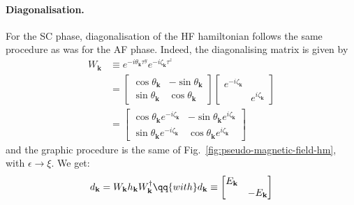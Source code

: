 \paragraph{Diagonalisation.}

For the SC phase, diagonalisation of the HF hamiltonian follows the same procedure as was for the AF phase. Indeed, the diagonalising matrix is given by
\begin{align}
	W_\mathbf{k} &\equiv e^{-i \theta_\mathbf{k} \tau^y} e^{-i \zeta_\mathbf{k} \tau^z} \nonumber \\
	&= \begin{bmatrix}
		\cos \theta_\mathbf{k} & - \sin \theta_\mathbf{k} \\
		\sin \theta_\mathbf{k} & \cos \theta_\mathbf{k}
	\end{bmatrix} \begin{bmatrix}
		e^{-i\zeta_\mathbf{k}} & \\ 
		& e^{i\zeta_\mathbf{k}}
	\end{bmatrix} \nonumber \\
	&= \begin{bmatrix}
		\cos \theta_\mathbf{k} e^{-i\zeta_\mathbf{k}} & - \sin \theta_\mathbf{k} e^{i\zeta_\mathbf{k}} \\
		\sin \theta_\mathbf{k} e^{-i\zeta_\mathbf{k}} & \cos \theta_\mathbf{k} e^{i\zeta_\mathbf{k}}
	\end{bmatrix} \label{eq:sc-hm-diagonalizer}
\end{align}
and the graphic procedure is the same of Fig.~\ref{fig:pseudo-magnetic-field-hm}, with $\epsilon \to \xi$. We get:
\begin{equation}\label{eq:sc-WhW+-hm}
	d_\mathbf{k} = W_\mathbf{k} h_\mathbf{k} W_\mathbf{k}^\dagger
	\qq{with}
	d_\mathbf{k} \equiv \begin{bmatrix}
		E_\mathbf{k} & \\
		& - E_\mathbf{k}
	\end{bmatrix}
\end{equation}

